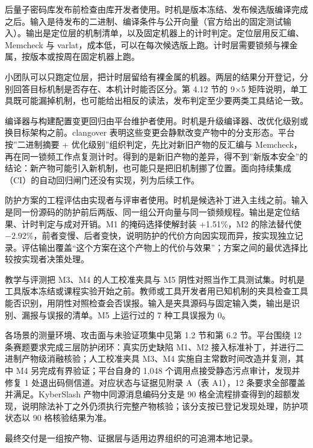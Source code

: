 后量子密码库发布前检查由库开发者使用。时机是版本冻结、发布候选版编译完成之后。输入是待发布的二进制、编译条件与公开向量（官方给出的固定测试输入）。输出是定位层的机制清单，以及固定机器上的计时判定。定位层用反汇编、Memcheck 与 varlat，成本低，可以在每次候选版上跑。计时层需要锁频与裸金属，按版本或按周在固定机器上跑。

小团队可以只跑定位层，把计时层留给有裸金属的机器。两层的结果分开登记，分别回答目标机制是否存在、本机计时能否区分。第 4.12 节的 9×5 矩阵说明，单工具既可能漏掉机制，也可能给出相反的读法，发布判定至少要两类工具结论一致。

编译器与构建配置变更回归由平台维护者使用。时机是升级编译器、改优化级别或换目标架构之前。clangover 表明这些变更会静默改变产物中的分支形态\cite{clangover}。平台按”二进制摘要 + 优化级别”组织判定，先比对新旧产物的反汇编与 Memcheck，再在同一锁频工作点复测计时。得到的是新旧产物的差异，得不到”新版本安全”的结论：新产物可能引入新机制，也可能只是把旧机制挪了位置。面向持续集成（CI）的自动回归闸门还没有实现，列为后续工作。

防护方案的工程评估由实现者与评审者使用。时机是候选补丁进入主线之前。输入是同一份源码的防护前后两版、同一组公开向量与同一锁频规程。输出是定位结果、计时判定与成对开销。M1 的掩码选择使解封装 +1.51\%，M2 的除法替代使 $-2.92\%$，前者变慢、后者变快，说明防护的代价方向因实现而异，按实现独立记录。评估输出覆盖“这个方案在这个产物上的代价与效果”；方案之间的最优选择比较按实现者决策处理。%

教学与评测把 M3、M4 的人工校准夹具与 M5 阴性对照当作工具测试集。时机是工具版本冻结或课程实验开始之前。教师或工具开发者用已知机制的夹具检查工具能否识别，用阴性对照检查会否误报。输入是夹具源码与固定输入类，输出是识别、漏报与误报的清单。M5 上运行过的 7 种工具误报为 0。%

各场景的测量环境、攻击面与未验证项集中见第 1.2 节和第 6.2 节。平台围绕 12 条赛题要求完成三层防护闭环：真实历史缺陷 M1、M2 接入标准补丁，并进行二进制产物级消融核验；人工校准夹具 M3、M4 实施自主常数时间改造并复测，其中 M4 另完成有界验证；平台自身的 1,048 个调用点接受静态污点审计，发现并修复 1 处退出码侧信道。对应状态与证据见附录 A（表 A1），12 条要求全部覆盖并满足。KyberSlash 产物中同源消息编码分支是 90 格全流程排查得到的超额发现，说明除法补丁之外仍须执行完整产物核验；该分支按已登记发现处理，防护项状态以 90 格核验结果为准。%

最终交付是一组按产物、证据层与适用边界组织的可追溯本地记录。
